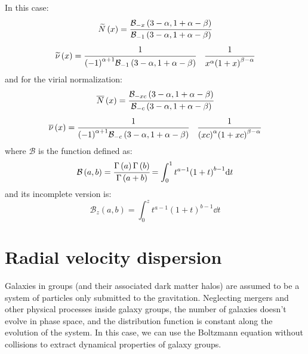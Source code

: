 In this case:
%
\begin{equation}
    \widetilde{N} \left(x\right) = \cfrac{%
        \mathcal{B}_{-x} \left(3-\alpha, 1+\alpha-\beta\right)}
    {\mathcal{B}_{-1} \left(3-\alpha, 1+\alpha-\beta\right)}
\end{equation}
%
\begin{equation}
    \widetilde\nu \left(x\right) = \cfrac{1}
    {{\left(-1\right)}^{\alpha+1}
        \mathcal{B}_{-1} \left(3-\alpha, 1+\alpha-\beta\right)}
    \quad\cfrac{1}
    {x^\alpha {\left(1+x\right)}^{\beta-\alpha}}
\end{equation}
%
and for the virial normalization:
%
\begin{equation}
    \overline{N} \left(x\right) = \cfrac{%
        \mathcal{B}_{-xc} \left(3-\alpha, 1+\alpha-\beta\right)}
    {\mathcal{B}_{-c} \left(3-\alpha, 1+\alpha-\beta\right)}
\end{equation}
%
\begin{equation}
    \overline\nu \left(x\right) = \cfrac{1}
    {{\left(-1\right)}^{\alpha+1}
        \mathcal{B}_{-c} \left(3-\alpha, 1+\alpha-\beta\right)}
    \quad\cfrac{1}
    {{\left(xc\right)}^\alpha {\left(1+xc\right)}^{\beta-\alpha}}
\end{equation}
%
where $\mathcal{B}$ is the function defined as:
%
\begin{equation}
    \mathcal{B} \left(a, b\right) =
    \cfrac{\Gamma \left(a\right) \Gamma \left(b\right)}
    {\Gamma \left(a+b\right)} =
    \int_0^1 t^{a-1} {\left(1+t\right)}^{b-1} {\rm{d}} t
\end{equation}
%
and its incomplete version is:
%
\begin{equation}
    \mathcal{B}_z \left(a, b\right) =
    \int_0^z t^{a-1} {\left(1+t\right)}^{b-1} \dd t
\end{equation}

\section{Radial velocity dispersion}
\label{sec:radial_velocity_dispersion}

Galaxies in groups (and their associated dark matter halos) are assumed to be a
system of particles only submitted to the gravitation. Neglecting mergers and
other physical processes inside galaxy groups, the number of galaxies doesn't
evolve in phase space, and the distribution function is constant along the
evolution of the system. In this case, we can use the Boltzmann equation
without collisions to extract dynamical properties of galaxy groups.

